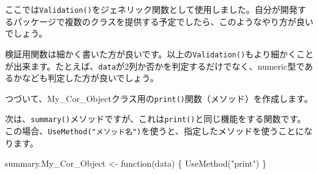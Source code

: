 \documentclass[
  a4paper,
  pandoc,
  ja=standard,
  jafont=haranoaji]{bxjsbook}
\newenvironment{Shaded}{\begin{snugshade}}{\end{snugshade}}
\newcommand{\ControlFlowTok}[1]{\textcolor[rgb]{0.00,0.48,0.65}{#1}}
\newcommand{\DecValTok}[1]{\textcolor[rgb]{0.68,0.00,0.00}{#1}}
\newcommand{\FunctionTok}[1]{\textcolor[rgb]{0.28,0.35,0.67}{#1}}
\newcommand{\NormalTok}[1]{\textcolor[rgb]{0.00,0.48,0.65}{#1}}
\newcommand{\OtherTok}[1]{\textcolor[rgb]{0.00,0.48,0.65}{#1}}
\newcommand{\SpecialCharTok}[1]{\textcolor[rgb]{0.37,0.37,0.37}{#1}}
\newcommand{\StringTok}[1]{\textcolor[rgb]{0.13,0.47,0.30}{#1}}
\begin{document}
ここでは\texttt{Validation()}をジェネリック関数として使用しました。自分が開発するパッケージで複数のクラスを提供する予定でしたら、このようなやり方が良いでしょう。

検証用関数は細かく書いた方が良いです。以上の\texttt{Validation()}もより細かくことが出来ます。たとえば、\texttt{data}が2列か否かを判定するだけでなく、numeric型であるかなども判定した方が良いでしょう。

つづいて、My\_Cor\_Objectクラス用の\texttt{print()}関数（メソッド）を作成します。

\begin{Shaded}
\end{Shaded}

次は、\texttt{summary()}メソッドですが、これは\texttt{print()}と同じ機能をする関数です。この場合、\texttt{UseMethod("メソッド名")}を使うと、指定したメソッドを使うことになります。

\begin{Shaded}
\begin{Highlighting}[numbers=left,,]
\NormalTok{summary.My\_Cor\_Object }\OtherTok{\textless{}{-}} \ControlFlowTok{function}\NormalTok{(data) \{}
  \FunctionTok{UseMethod}\NormalTok{(}\StringTok{"print"}\NormalTok{)}
\NormalTok{\}}
\end{Highlighting}
\end{Shaded}
\end{document}
